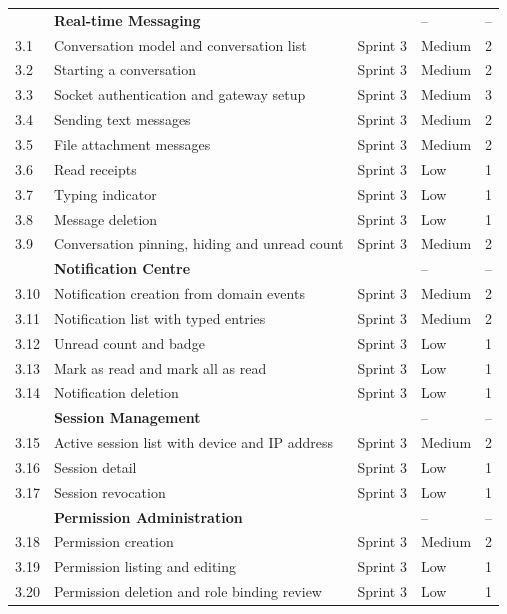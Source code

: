 \begin{longtable}{|
C{1.0cm}|
L{6.9cm}|
C{1.8cm}|
C{2.1cm}|
C{2.3cm}|}

 & \textbf{Real-time Messaging} &  & -- & -- \\
3.1 & Conversation model and conversation list & Sprint 3 & Medium & 2 \\
3.2 & Starting a conversation & Sprint 3 & Medium & 2 \\
3.3 & Socket authentication and gateway setup & Sprint 3 & Medium & 3 \\
3.4 & Sending text messages & Sprint 3 & Medium & 2 \\
3.5 & File attachment messages & Sprint 3 & Medium & 2 \\
3.6 & Read receipts & Sprint 3 & Low & 1 \\
3.7 & Typing indicator & Sprint 3 & Low & 1 \\
3.8 & Message deletion & Sprint 3 & Low & 1 \\
3.9 & Conversation pinning, hiding and unread count & Sprint 3 & Medium & 2 \\
\hline

 & \textbf{Notification Centre} &  & -- & -- \\
3.10 & Notification creation from domain events & Sprint 3 & Medium & 2 \\
3.11 & Notification list with typed entries & Sprint 3 & Medium & 2 \\
3.12 & Unread count and badge & Sprint 3 & Low & 1 \\
3.13 & Mark as read and mark all as read & Sprint 3 & Low & 1 \\
3.14 & Notification deletion & Sprint 3 & Low & 1 \\
\hline

 & \textbf{Session Management} &  & -- & -- \\
3.15 & Active session list with device and IP address & Sprint 3 & Medium & 2 \\
3.16 & Session detail & Sprint 3 & Low & 1 \\
3.17 & Session revocation & Sprint 3 & Low & 1 \\
\hline

 & \textbf{Permission Administration} &  & -- & -- \\
3.18 & Permission creation & Sprint 3 & Medium & 2 \\
3.19 & Permission listing and editing & Sprint 3 & Low & 1 \\
3.20 & Permission deletion and role binding review & Sprint 3 & Low & 1 \\
\hline


\end{longtable}

